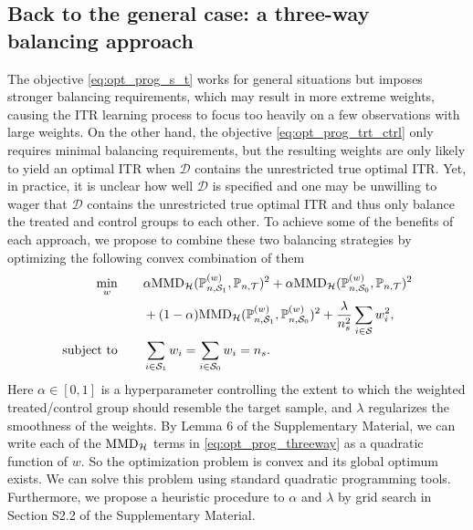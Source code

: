 \documentclass[12pt]{article}
\newcommand{\prob}{\mathbb{P}}
\begin{document}
\subsection{Back to the general case: a three-way balancing approach}
The objective \eqref{eq:opt_prog_s_t} works for general situations but imposes stronger balancing requirements, which may result in more extreme weights, causing the ITR learning process to focus too heavily on a few observations with large weights. On the other hand, the objective \eqref{eq:opt_prog_trt_ctrl} only requires minimal balancing requirements, but the resulting weights are only likely to yield an optimal ITR when $\mathcal{D}$ contains the unrestricted true optimal ITR. Yet, in practice, it is unclear how well $\mathcal{D}$ is specified and one may be unwilling to wager that $\mathcal{D}$ contains the unrestricted true optimal ITR and thus only balance the treated and control groups to each other. To achieve some of the benefits of each approach, we propose to combine these two balancing strategies by optimizing the following convex combination of them
\begin{equation}
    \label{eq:opt_prog_threeway}
    \begin{aligned}
    \min_w &\qquad
    \alpha \textnormal{MMD}_\mathcal{H}(\prob_{n,\mathcal{S}_1}^{(w)}, \prob_{n,\mathcal{T}})^2 + 
    \alpha \textnormal{MMD}_\mathcal{H}(\prob_{n,\mathcal{S}_0}^{(w)}, \prob_{n,\mathcal{T}})^2
    \\&\qquad
    + (1-\alpha) \textnormal{MMD}_\mathcal{H}(\prob_{n,\mathcal{S}_1}^{(w)}, \prob_{n,\mathcal{S}_0}^{(w)})^2 + 
    \frac{\lambda}{n_s^2} \sum_{i \in \mathcal{S}} w_i^2,
    \\
    \textnormal{subject to}&\qquad
    \sum_{i \in \mathcal{S}_1} w_i = \sum_{i \in \mathcal{S}_0} w_i = n_s
    .\end{aligned}
\end{equation}
Here $\alpha \in [0, 1]$ is a hyperparameter controlling the extent to which the weighted treated/control group should resemble the target sample, and $\lambda$ regularizes the smoothness of the weights.	By Lemma 6 of the Supplementary Material, we can write each of the $\textnormal{MMD}_\mathcal{H}$ terms in \eqref{eq:opt_prog_threeway} as a quadratic function of $w$. So the optimization problem is convex and its global optimum exists. We can solve this problem using standard quadratic programming tools. Furthermore, we propose a heuristic procedure to  $\alpha$ and $\lambda$ by grid search in Section S2.2 of the Supplementary Material.
\end{document}
